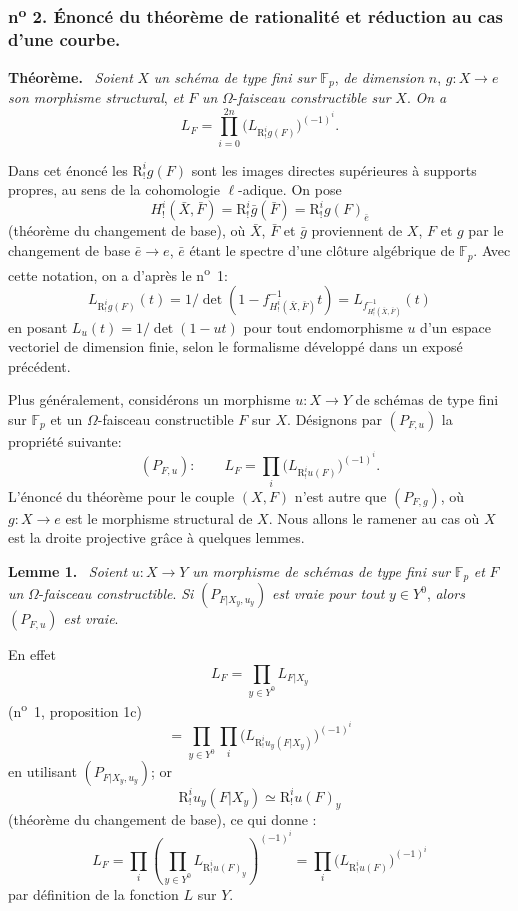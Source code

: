 \documentclass[11pt]{article}
\newenvironment{statement}[1]{\par\medskip\noindent\textbf{#1.}\ }{\par\medskip}
\begin{document}
\subsubsection*{n\textsuperscript{o} 2. Énoncé du théorème de rationalité et réduction au cas d'une courbe.}

\begin{statement}{Théorème}
\emph{Soient} $X$ \emph{un schéma de type fini sur} $\mathbb F_p$, \emph{de dimension} $n$, $g:X\to e$ \emph{son morphisme structural}, \emph{et} $F$ \emph{un} $\Omega$-\emph{faisceau constructible sur} $X$. \emph{On a}
\[
L_F=\prod_{i=0}^{2n}\bigl(L_{\mathrm{R}^i_!g(F)}\bigr)^{(-1)^i}.
\tag{1}
\]
\end{statement}

Dans cet énoncé les $\mathrm{R}^i_!g(F)$ sont les images directes supérieures à supports propres, au sens de la cohomologie $\ell$-adique. On pose
\[
H^i_!(\bar X,\bar F)=\mathrm{R}^i_!\bar g(\bar F)=\mathrm{R}^i_!g(F)_{\bar e}
\]
(théorème du changement de base), où 
$\bar X$, $\bar F$ et $\bar g$
proviennent de $X$, $F$ et $g$ par le changement de base $\bar e\to e$, $\bar e$ étant le spectre d'une clôture algébrique de $\mathbb F_p$. Avec cette notation, on a d'après le n\textsuperscript{o}~1:
\[
L_{\mathrm{R}^i_!g(F)}(t)=1/\det(1-f^{-1}_{H^i_!(\bar X,\bar F)}t)
 =L_{f^{-1}_{H^i_!(\bar X,\bar F)}}(t)
\]
en posant $L_u(t)=1/\det(1-ut)$ pour tout endomorphisme $u$ d'un espace vectoriel de dimension finie, selon le formalisme développé dans un exposé précédent.

Plus généralement, considérons un morphisme $u:X\to Y$ de schémas de type fini sur $\mathbb F_p$ et un $\Omega$-faisceau constructible $F$ sur $X$. Désignons par $(P_{F,u})$ la propriété suivante:
\[
(P_{F,u}):\qquad
L_F=\prod_i\bigl(L_{\mathrm{R}^i_!u(F)}\bigr)^{(-1)^i}.
\]
L'énoncé du théorème pour le couple $(X,F)$ n'est autre que $(P_{F,g})$, où $g:X\to e$ est le morphisme structural de $X$. Nous allons le ramener au cas où $X$ est la droite projective grâce à quelques lemmes.

\begin{statement}{Lemme 1}
\emph{Soient} $u:X\to Y$ \emph{un morphisme de schémas de type fini sur} $\mathbb F_p$ \emph{et} $F$ \emph{un} $\Omega$-\emph{faisceau constructible}. \emph{Si} $(P_{F|X_y,u_y})$ \emph{est vraie pour tout} $y\in Y^0$, \emph{alors} $(P_{F,u})$ \emph{est vraie}.
\end{statement}

En effet
\[
L_F=\prod_{y\in Y^0}L_{F|X_y}
\]
(n\textsuperscript{o}~1, proposition 1c)
\[
=\prod_{y\in Y^0}\prod_i\bigl(L_{\mathrm{R}^i_!u_y(F|X_y)}\bigr)^{(-1)^i}
\]
en utilisant $(P_{F|X_y,u_y})$; or
\[
\mathrm{R}^i_!u_y(F|X_y)\simeq \mathrm{R}^i_!u(F)_y
\]
(théorème du changement de base), ce qui 
donne :
\[
L_F=\prod_i\left(\prod_{y\in Y^0}L_{\mathrm{R}^i_!u(F)_y}\right)^{(-1)^i}
=\prod_i\bigl(L_{\mathrm{R}^i_!u(F)}\bigr)^{(-1)^i}
\]
par
définition de la fonction $L$ sur $Y$.
\end{document}

